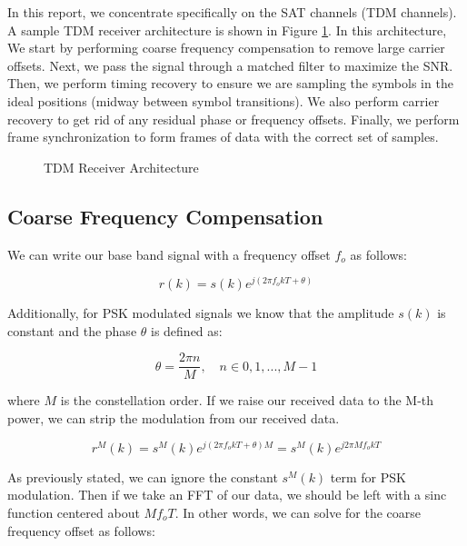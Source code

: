 \documentclass[conference,onecolumn]{IEEEtran}
\begin{document}
In this report, we concentrate specifically on the SAT channels (TDM channels). A sample TDM receiver architecture is shown in Figure \ref{fig::tdm_receiver_architecture}. In this architecture, We start by performing coarse frequency compensation to remove large carrier offsets. Next, we pass the signal through a matched filter to maximize the SNR. Then, we perform timing recovery to ensure we are sampling the symbols in the ideal positions (midway between symbol transitions). We also perform carrier recovery to get rid of any residual phase or frequency offsets. Finally, we perform frame synchronization to form frames of data with the correct set of samples.

\begin{figure}[H]
	\centerline{}
	\caption{TDM Receiver Architecture}
	\label{fig::tdm_receiver_architecture}
\end{figure}

\subsection{Coarse Frequency Compensation}

We can write our base band signal with a frequency offset $f_o$ as follows:

\begin{equation}
	r(k) = s(k)e^{j(2{\pi}f_okT + \theta)}
\end{equation}

\noindent Additionally, for PSK modulated signals we know that the amplitude $s(k)$ is constant and the phase $\theta$ is defined as:

\begin{equation}
	\theta = \frac{2{\pi}n}{M},\quad n \in 0,1,...,M-1
\end{equation}

\noindent where $M$ is the constellation order. If we raise our received data to the M-th power, we can strip the modulation from our received data.

\begin{equation}
	r^M(k) = s^M(k)e^{j(2{\pi}f_okT + \theta)M} = s^M(k)e^{j2{\pi}Mf_okT}
\end{equation}

\noindent As previously stated, we can ignore the constant $s^M(k)$ term for PSK modulation. Then if we take an FFT of our data, we should be left with a sinc function centered about $Mf_oT$. In other words, we can solve for the coarse frequency offset as follows:
\end{document}
